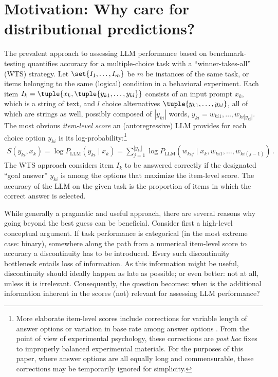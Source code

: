 \documentclass[fleqn]{article}
\begin{document}
\section{Motivation: Why care for distributional predictions?}
\label{motivation}

The prevalent approach to assessing LLM performance based on benchmark-testing quantifies accuracy for a multiple-choice task with a ``winner-takes-all'' (WTS) strategy.
Let $\set{I_{1}, \dots, I_{m}}$ be $m$ be instances of the same task, or items belonging to the same (logical) condition in a behavioral experiment.
Each item $I_{k} = \tuple{x_{k}, \tuple{y_{k1}, \dots, y_{kl}}}$ consists of an input prompt $x_{k}$, which is a string of text, and $l$ choice alternatives $\tuple{y_{k1}, \dots, y_{kl}}$, all of which are strings as well, possibly composed of $|y_{ki}|$ words, $y_{ki} = w_{ki1}, \dots, w_{ki|y_{ki}|}$.
The most obvious \emph{item-level score} an (autoregressive) LLM provides for each choice option $y_{ki}$ is its log-probability:\footnote{
  More elaborate item-level scores include corrections for variable length of answer options \citep[e.g.,][]{BrownMann2020:Language-Models} or variation in base rate among answer options \citep[e.g.,][]{HoltzmanWest2021:Surface-Form-Co}.
  From the point of view of experimental psychology, these corrections are \emph{post hoc} fixes to improperly balanced experimental materials.
  For the purposes of this paper, where answer options are all equally long and commensurable, these corrections may be temporarily ignored for simplicity.
}
%
\begin{align*}
  S\left( y_{ki}, x_{k} \right) = \log P_{\text{LLM}} \left(y_{ki} \mid x_{k} \right) =  \sum_{j=1}^{|y_{ki}|} \log P_{\text{LLM}} \left(w_{kij} \mid x_{k}, w_{ki1}, \dots, w_{ki(j-1)} \right)  \,.
\end{align*}
%
The WTS approach considers item $I_{k}$ to be answered correctly if the designated ``goal answer'' $y_{ki}$ is among the options that maximize the item-level score.
The accuracy of the LLM on the given task is the proportion of items in which the correct answer is selected.

While generally a pragmatic and useful approach, there are several reasons why going beyond the best guess can be beneficial.
Consider first a high-level conceptual argument.
If task performance is categorical (in the most extreme case: binary), somewhere along the path from a numerical item-level score to accuracy a discontinuity has to be introduced.
Every such discontinuity bottleneck entails loss of information.
As this information might be useful, discontinuity should ideally happen as late as possible; or even better: not at all, unless it is irrelevant.
Consequently, the question becomes: when is the additional information inherent in the scores (not) relevant for assessing LLM performance?
\end{document}
